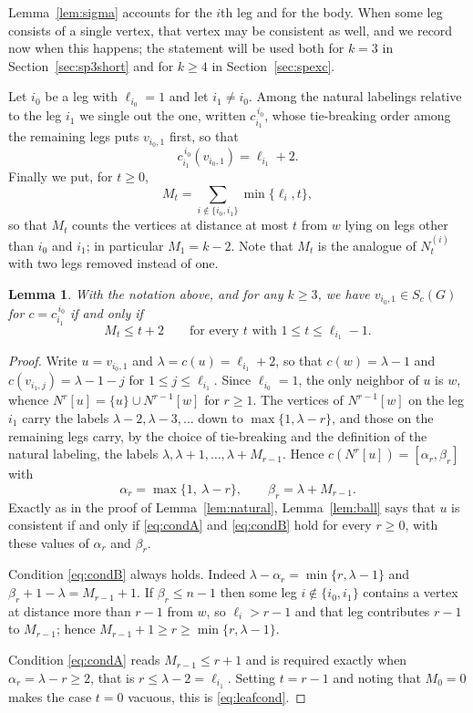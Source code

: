 \documentclass[reqno,10pt]{article}
\newtheorem{lemma}[theorem]{Lemma}
\theoremstyle{definition}
\numberwithin{equation}{section}
\numberwithin{theorem}{section}
\newcommand{\Ball}[2]{N^{#2}[#1]}
\newcommand{\Ntwo}{M}
\begin{document}
Lemma~\ref{lem:sigma} accounts for the $i$th leg and for the body. When some
leg consists of a single vertex, that vertex may be consistent as well, and we
record now when this happens; the statement will be used both for $k=3$ in
Section~\ref{sec:sp3short} and for $k\ge4$ in Section~\ref{sec:spexc}.

Let $i_0$ be a leg with $\ell_{i_0}=1$ and let $i_1\ne i_0$. Among the natural
labelings relative to the leg $i_1$ we single out the one, written
$c_{i_1}^{\,i_0}$, whose tie-breaking order among the remaining legs puts
$v_{i_0,1}$ first, so that
\[
  c_{i_1}^{\,i_0}(v_{i_0,1})=\ell_{i_1}+2 .
\]
Finally we put, for $t\ge0$,
\begin{equation}
  \Ntwo_t=\sum_{i\notin\{i_0,i_1\}}\min\{\ell_i,t\} ,
  \label{eq:Mt}
\end{equation}
so that $\Ntwo_t$ counts the vertices at distance at most $t$ from $w$ lying on
legs other than $i_0$ and $i_1$; in particular $\Ntwo_1=k-2$. Note that $\Ntwo_t$ is
the analogue of $N^{(i)}_t$ with two legs removed instead of one.

\begin{lemma}
\label{lem:leafconsistent}
With the notation above, and for any $k\ge3$, we have
$v_{i_0,1}\in S_c(G)$ for $c=c_{i_1}^{\,i_0}$ if and only if
\begin{equation}
  \Ntwo_t\le t+2 \qquad\text{for every } t \text{ with } 1\le t\le \ell_{i_1}-1 .
  \label{eq:leafcond}
\end{equation}
\end{lemma}

\begin{proof}
Write $u=v_{i_0,1}$ and $\lambda=c(u)=\ell_{i_1}+2$, so that
$c(w)=\lambda-1$ and $c(v_{i_1,j})=\lambda-1-j$ for $1\le j\le\ell_{i_1}$.
Since $\ell_{i_0}=1$, the only neighbor of $u$ is $w$, whence
$\Ball{u}{r}=\{u\}\cup \Ball{w}{r-1}$ for $r\ge1$. The vertices of
$\Ball{w}{r-1}$ on the leg $i_1$ carry the labels
$\lambda-2,\lambda-3,\dots$ down to $\max\{1,\lambda-r\}$, and those on the
remaining legs carry, by the choice of tie-breaking and the definition of the
natural labeling, the labels $\lambda,\lambda+1,\dots,\lambda+\Ntwo_{r-1}$. Hence
$c(\Ball{u}{r})=[\alpha_r,\beta_r]$ with
\[
  \alpha_r=\max\{1,\ \lambda-r\},\qquad \beta_r=\lambda+\Ntwo_{r-1}.
\]
Exactly as in the proof of Lemma~\ref{lem:natural}, Lemma~\ref{lem:ball} says
that $u$ is consistent if and only if \eqref{eq:condA} and \eqref{eq:condB}
hold for every $r\ge0$, with these values of $\alpha_r$ and $\beta_r$.

Condition \eqref{eq:condB} always holds. Indeed
$\lambda-\alpha_r=\min\{r,\lambda-1\}$ and $\beta_r+1-\lambda=\Ntwo_{r-1}+1$. If
$\beta_r\le n-1$ then some leg $i\notin\{i_0,i_1\}$ contains a vertex at
distance more than $r-1$ from $w$, so $\ell_i>r-1$ and that leg contributes
$r-1$ to $\Ntwo_{r-1}$; hence $\Ntwo_{r-1}+1\ge r\ge\min\{r,\lambda-1\}$.

Condition \eqref{eq:condA} reads $\Ntwo_{r-1}\le r+1$ and is required exactly when
$\alpha_r=\lambda-r\ge2$, that is $r\le \lambda-2=\ell_{i_1}$. Setting
$t=r-1$ and noting that $\Ntwo_0=0$ makes the case $t=0$ vacuous, this is
\eqref{eq:leafcond}.
\end{proof}
\end{document}
